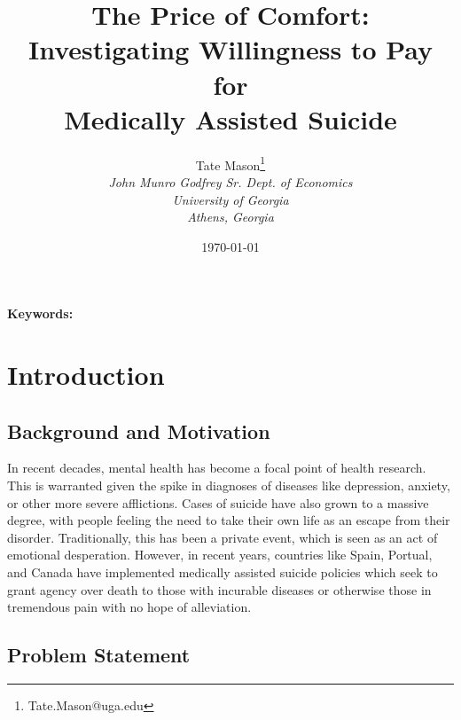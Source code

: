 \documentclass[11pt,a4paper]{article}
\title{The Price of Comfort: Investigating Willingness to Pay for \\
Medically Assisted Suicide}
\author{
    Tate Mason\thanks{Tate.Mason@uga.edu} \\
    \textit{John Munro Godfrey Sr. Dept. of Economics} \\
    \textit{University of Georgia} \\
    \textit{Athens, Georgia} \\
}
\date{\today}
\newenvironment{abstract}%
{\cleardoublepage\null \vfill\begin{center}%
\bfseries \abstractname \end{center}}%
{\vfill\null}
\begin{document}
\maketitle
\thispagestyle{empty}

\begin{abstract}
\noindent %

\vspace{0.3cm}
\noindent \textbf{Keywords:} %
\end{abstract}

\newpage
\setcounter{page}{1}

\section{Introduction}
\label{sec:introduction}

\subsection{Background and Motivation}
\label{subsec:background}

In recent decades, mental health has become a focal point of health research. This is warranted given the spike in diagnoses of diseases like depression, anxiety, or other more severe
afflictions. Cases of suicide have also grown to a massive degree, with people feeling the need to take their own life as an escape from their disorder. Traditionally, this has been a
private event, which is seen as an act of emotional desperation. However, in recent years, countries like Spain, Portual, and Canada have implemented medically assisted suicide policies
which seek to grant agency over death to those with incurable diseases or otherwise those in tremendous pain with no hope of alleviation.

\subsection{Problem Statement}
\label{subsec:problem}
\end{document}
